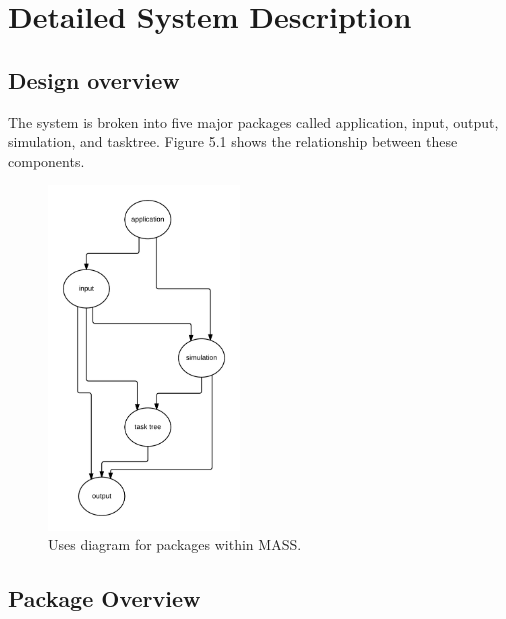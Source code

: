 \chapter{Detailed System Description}\label{detailedSystemDescription}

\section{Design overview}

The system is broken into five major packages called application, input, output, simulation, and tasktree. Figure 5.1 shows the relationship between these components.

\begin{figure}[htb]
\centering
\includegraphics[width=2.0in]{figs/UsesDiagram}
\caption{Uses diagram for packages within MASS.}
\label{fig:UsesDiagram }
\end{figure}

\section{Package Overview}

